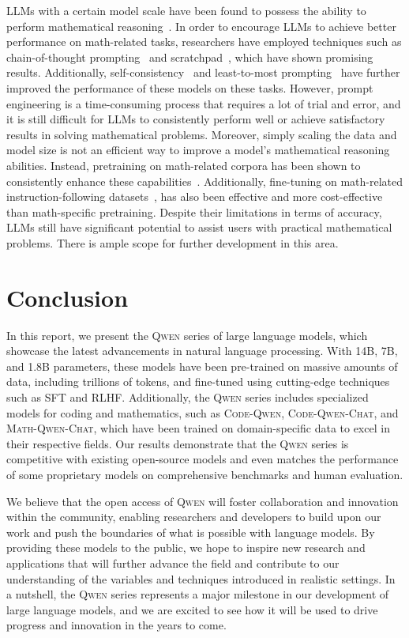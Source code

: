 LLMs with a certain model scale have been found to possess the ability to perform mathematical reasoning~\citep{Wei2022EmergentAO, bbh}. In order to encourage LLMs to achieve better performance on math-related tasks, researchers have employed techniques such as chain-of-thought prompting~\citep{cot} and scratchpad~\citep{scratchpad}, which have shown promising results. Additionally, self-consistency~\citep{self_consistency} and least-to-most prompting~\citep{least_to_most} have further improved the performance of these models on these tasks. However, prompt engineering is a time-consuming process that requires a lot of trial and error, and it is still difficult for LLMs to consistently perform well or achieve satisfactory results in solving mathematical problems. Moreover, simply scaling the data and model size is not an efficient way to improve a model's mathematical reasoning abilities. Instead, pretraining on math-related corpora has been shown to consistently enhance these capabilities~\citep{hendrycks2021measuring,lewkowycz2022solving,taylor2022galactica,lightman2023lets}. Additionally, fine-tuning on math-related instruction-following datasets~\citep{alpaca-cot, rft, wizardmath, yue2023mammoth,abel,yu2023metamath}, has also been effective and more cost-effective than math-specific pretraining. Despite their limitations in terms of accuracy, LLMs still have significant potential to assist users with practical mathematical problems. There is ample scope for further development in this area.

\section{Conclusion}
\label{sec:conclusion}

In this report, we present the \textsc{Qwen} series of large language models, which showcase the latest advancements in natural language processing. With 14B, 7B, and 1.8B parameters, these models have been pre-trained on massive amounts of data, including trillions of tokens, and fine-tuned using cutting-edge techniques such as SFT and RLHF. Additionally, the \textsc{Qwen} series includes specialized models for coding and mathematics, such as \textsc{Code-Qwen}, \textsc{Code-Qwen-Chat}, and \textsc{Math-Qwen-Chat}, which have been trained on domain-specific data to excel in their respective fields. Our results demonstrate that the \textsc{Qwen} series is competitive with existing open-source models and even matches the performance of some proprietary models on comprehensive benchmarks and human evaluation. 

We believe that the open access of \textsc{Qwen} will foster collaboration and innovation within the community, enabling researchers and developers to build upon our work and push the boundaries of what is possible with language models. By providing these models to the public, we hope to inspire new research and applications that will further advance the field and contribute to our understanding of the variables and techniques introduced in realistic settings. In a nutshell, the \textsc{Qwen} series represents a major milestone in our development of large language models, and we are excited to see how it will be used to drive progress and innovation in the years to come.


